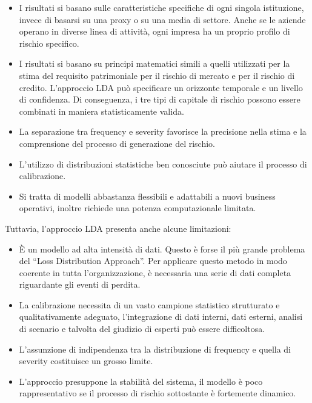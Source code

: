 \documentclass[titlepage]{article}
\begin{document}
\begin{itemize}
{\begin{itemize}
	\item 	I risultati si basano sulle caratteristiche specifiche di ogni singola istituzione, invece di basarsi su una proxy o su una media di settore. Anche se le aziende operano in diverse linea di attività, ogni impresa ha un proprio profilo di rischio specifico.  
	\item 	I risultati si basano su principi matematici simili a quelli utilizzati per la stima del requisito patrimoniale per il rischio di mercato e per il rischio di credito. L'approccio LDA può specificare un orizzonte temporale e un livello di confidenza. Di conseguenza, i tre tipi di capitale di rischio possono essere combinati in maniera statisticamente valida.  
	\item 	La separazione tra frequency e severity favorisce la precisione nella stima e la comprensione del processo di generazione del rischio.  
	\item 	L’utilizzo di distribuzioni statistiche ben conosciute può aiutare il processo di calibrazione.  
	\item 	Si tratta di modelli abbastanza flessibili e adattabili a nuovi business operativi, inoltre richiede una potenza computazionale limitata.
\end{itemize}
	 Tuttavia, l'approccio LDA presenta anche alcune limitazioni: 
	\begin{itemize}
	\item 	È un modello ad alta intensità di dati. Questo è forse il più grande problema del “Loss Distribution Approach”. Per applicare questo metodo in modo coerente in tutta l'organizzazione, è necessaria una serie di dati completa riguardante gli eventi di perdita.  
	\item La calibrazione necessita di un vasto campione statistico strutturato e qualitativamente adeguato, l’integrazione di dati interni, dati esterni, analisi di scenario e talvolta del giudizio di esperti può essere difficoltosa.  
	\item 	L’assunzione di indipendenza tra la distribuzione di frequency e quella di severity costituisce un grosso limite.  
	\item 	L’approccio presuppone la stabilità del sistema, il modello è poco rappresentativo se il processo di rischio sottostante è fortemente dinamico. 
\end{itemize}

}
\end{itemize}
\end{document}
